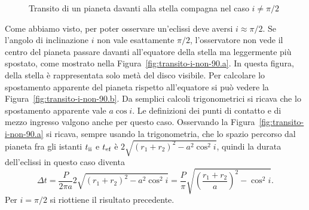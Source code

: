 \begin{figure}
{}
  \caption{Transito di un pianeta davanti alla stella compagna nel caso
    $i \neq \pi/2$}
  \label{fig:transito-i-non-90}
\end{figure}
Come abbiamo visto, per poter osservare un'eclissi deve aversi $i \approx
\pi/2$. Se l'angolo di inclinazione $i$ non vale esattamente $\pi/2$,
l'osservatore non vede il centro del pianeta passare davanti all'equatore della
stella ma leggermente più spostato, come mostrato nella
Figura~\ref{fig:transito-i-non-90.a}. In questa figura, della stella è
rappresentata solo metà del disco visibile. Per calcolare lo spostamento
apparente del pianeta rispetto all'equatore si può vedere la
Figura~\ref{fig:transito-i-non-90.b}. Da semplici calcoli trigonometrici si
ricava che lo spostamento apparente vale $a \cos i$. Le definizioni dei punti di
contatto e di mezzo ingresso valgono anche per questo caso. Osservando la
Figura~\ref{fig:transito-i-non-90.a} si ricava, sempre usando la trigonometria,
che lo spazio percorso dal pianeta fra gli istanti $t_{\textup{ii}}$ e
$t_{\textup{ef}}$ è $2\sqrt{(r_1 + r_2)^2 - a^2\cos^2 i}$, quindi la durata
dell'eclissi in questo caso diventa
\begin{equation}
  \Delta t = \frac{P}{2\pi a} 2\sqrt{(r_1 + r_2)^2 - a^2\cos^2 i} =
  \frac{P}{\pi} \sqrt{\left(\frac{r_1 + r_2}{a}\right)^2 - \cos^2 i}.
\end{equation}
Per $i = \pi/2$ si riottiene il risultato precedente.

